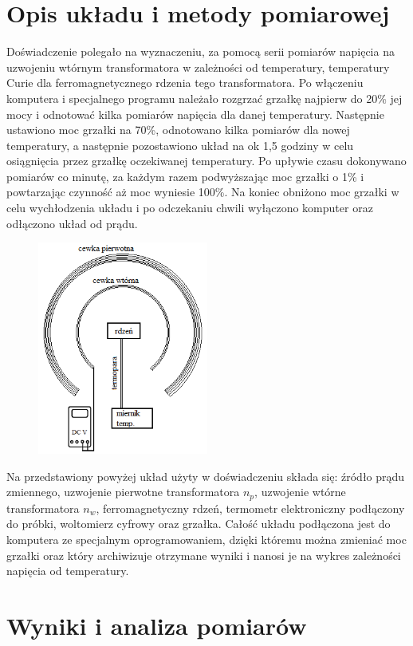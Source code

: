 \documentclass[a4paper,10pt]{article}
\begin{document}
\section{Opis układu i metody pomiarowej}
Doświadczenie polegało na wyznaczeniu, za pomocą serii pomiarów napięcia na uzwojeniu wtórnym transformatora w zależności od temperatury, temperatury Curie dla
ferromagnetycznego rdzenia tego transformatora. Po włączeniu komputera i specjalnego programu należało rozgrzać grzałkę najpierw do 20\% jej mocy i odnotować
kilka pomiarów napięcia dla danej temperatury. Następnie ustawiono moc grzałki na 70\%, odnotowano kilka pomiarów dla nowej temperatury, a następnie pozostawiono
układ na ok 1,5 godziny w celu osiągnięcia przez grzałkę oczekiwanej temperatury. Po upływie czasu dokonywano pomiarów co minutę, za każdym razem podwyższając moc grzałki o 1\% i powtarzając czynność aż moc wyniesie 100\%. Na koniec obniżono moc grzałki w celu wychłodzenia układu i po odczekaniu chwili wyłączono komputer oraz odłączono układ od prądu.
\begin{figure}[H]
\center
\includegraphics[width=0.5\textwidth]{uklad.png}
\end{figure}
Na przedstawiony powyżej układ użyty w doświadczeniu składa się: źródło prądu zmiennego, uzwojenie pierwotne transformatora $n_p$, uzwojenie wtórne transformatora $n_w$, ferromagnetyczny rdzeń, termometr elektroniczny podłączony do próbki, woltomierz cyfrowy oraz grzałka. Całość układu podłączona jest do komputera ze specjalnym oprogramowaniem, dzięki któremu można zmieniać moc grzałki oraz który archiwizuje otrzymane wyniki i nanosi je na wykres zależności napięcia od temperatury.

\section{Wyniki i analiza pomiarów}
\end{document}
